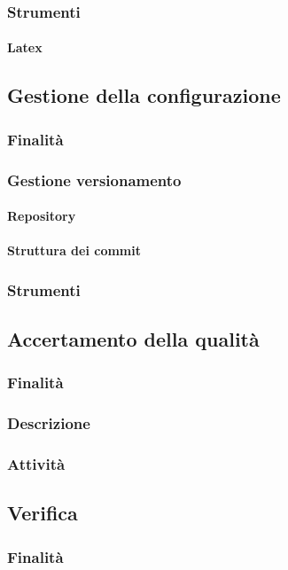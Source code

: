\documentclass[../norme-di-progetto.tex]{subfiles}
\begin{document}
\subsubsection{Strumenti}
\paragraph {Latex}
\subsection{Gestione della configurazione}
\subsubsection{Finalità}
\subsubsection{Gestione versionamento}
\paragraph{Repository}
\paragraph{Struttura dei commit}
\subsubsection{Strumenti}
\subsection{Accertamento della qualità}
\subsubsection{Finalità}
\subsubsection{Descrizione}
\subsubsection{Attività}
\subsection{Verifica}
\subsubsection{Finalità}
\end{document}
